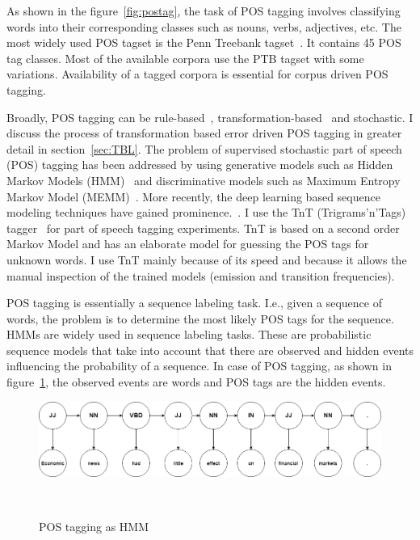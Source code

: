 As shown in the figure~\ref{fig:postag}, the task of POS tagging involves classifying words into their corresponding classes such as nouns, verbs, adjectives, etc. The most widely used POS tagset is the Penn Treebank tagset~\citep{Marcus:1994:PTA:1075812.1075835}. It contains 45 POS tag classes. Most of the available corpora use the PTB tagset with some variations. Availability of a tagged corpora is essential for corpus driven POS tagging. 

Broadly, POS tagging can be rule-based~, transformation-based~\citep{brill1992simple} and stochastic. I discuss the process of transformation based error driven POS tagging in greater detail in section~\ref{sec:TBL}. The problem of supervised stochastic part of speech (POS) tagging has been addressed by using generative models such as Hidden Markov Models (HMM)~\citep{brants:00.2} and  discriminative models such as Maximum Entropy Markov Model (MEMM)~\citep{ratnaparkhi1996maximum}. More recently, the deep learning based sequence modeling techniques have gained prominence.~. %
I use the TnT (Trigrams'n'Tags) tagger~\citep{brants:00.2} for part of speech tagging experiments. TnT is based on a second order Markov Model and has an elaborate model for guessing the POS tags for unknown words. I use TnT mainly because of its speed and because it allows the manual inspection of the trained models (emission and transition frequencies).

POS tagging is essentially a sequence labeling task. I.e., given a sequence of words, the problem is to determine the most likely POS tags for the sequence. HMMs are widely used in sequence labeling tasks. These are probabilistic sequence models that take into account that there are observed and hidden events influencing the probability of a sequence. In case of POS tagging, as shown in figure~\ref{fig:postaghmm}, the observed events are words and POS tags are the hidden events.

\begin{figure}[t]
    \includegraphics[scale = 0.45]{figures/hmmpos.png}
    \caption{POS tagging as HMM}~\label{fig:postaghmm}
\end{figure}

